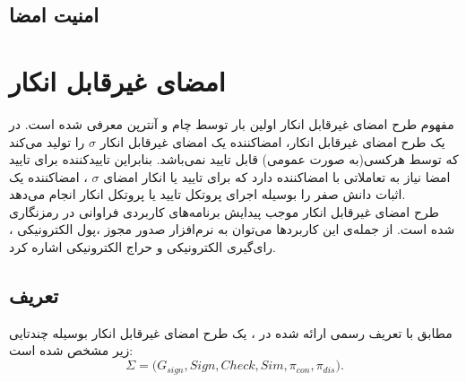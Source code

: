 \documentclass[12pt,a4paper]{article}
\begin{document}
\subsection{امنیت امضا}\label{sign_security}







\newpage
\section{\bf امضای غیرقابل انکار}\label{Undeniable_signature}\cite{undeniable}
مفهوم طرح امضای غیرقابل انکار اولین بار توسط چام و آنترپن
\cite{undeniable_chaum}
معرفی شده است. در یک طرح امضای غیرقابل انکار، امضاکننده یک امضای غیرقابل انکار
$\sigma$
را تولید می‌کند که توسط هرکسی(به صورت عمومی) قابل تایید نمی‌باشد. بنابراین تاییدکننده برای تایید امضا نیاز به تعاملاتی با امضاکننده دارد که برای تایید یا انکار امضای 
$\sigma$
، امضاکننده یک اثبات دانش صفر را بوسیله اجرای پروتکل تایید یا پروتکل انکار انجام می‌دهد.
\\
طرح امضای غیرقابل انکار موجب پیدایش برنامه‌های کاربردی فراوانی در رمزنگاری شده است. از جمله‌ی این کاربردها می‌توان به نرم‌افزار صدور مجوز
،پول الکترونیکی
، رای‌گیری الکترونیکی
و حراج الکترونیکی
اشاره کرد.
\subsection{\bf تعریف}
مطابق با تعریف رسمی ارائه شده در
\cite{convertibleـundeniable}
، یک طرح امضای غیرقابل انکار بوسیله چندتایی زیر مشخص شده است:
$$ \Sigma = \big( G_{sign} , Sign , Check , Sim , \pi_{con} , \pi_{dis} \big). $$
\end{document}

